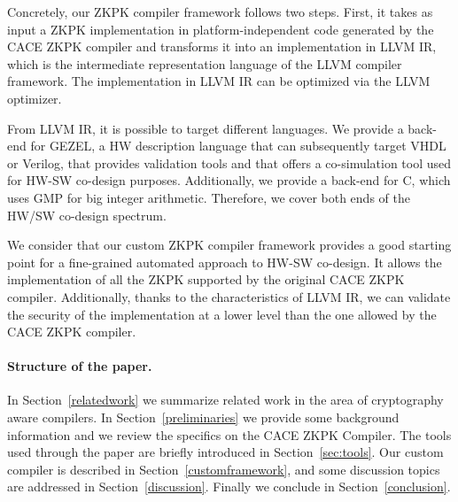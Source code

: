 Concretely, our ZKPK compiler framework follows two steps. First, it takes as input a ZKPK implementation in platform-independent code generated by the CACE ZKPK compiler and transforms it into an implementation in LLVM IR, which is the intermediate representation language of the LLVM compiler framework. The implementation in LLVM IR can be optimized via the LLVM optimizer.

From LLVM IR, it is possible to target different languages. We provide a back-end for GEZEL, a HW description language that can subsequently target VHDL or Verilog, that provides validation tools and that offers a co-simulation tool used for HW-SW co-design purposes. Additionally, we provide a back-end for C, which uses GMP for big integer arithmetic. Therefore, we cover both ends of the HW/SW co-design spectrum.

We consider that our custom ZKPK compiler framework provides a good starting point for a fine-grained automated approach to HW-SW co-design. It  allows the implementation of all the ZKPK supported by the original CACE ZKPK compiler. Additionally, thanks to the characteristics of LLVM IR, we can validate the security of the implementation at a lower level than the one allowed by the CACE ZKPK compiler.

\paragraph{Structure of the paper.} In Section~\ref{relatedwork} we summarize related work in the area of cryptography aware compilers. In Section~\ref{preliminaries} we provide some background information and we review the specifics on the CACE ZKPK Compiler. The tools used through the paper are briefly introduced in Section~\ref{sec:tools}. Our custom compiler is described in Section~\ref{customframework}, and some discussion topics are addressed in Section~\ref{discussion}. Finally we conclude in Section~\ref{conclusion}.

